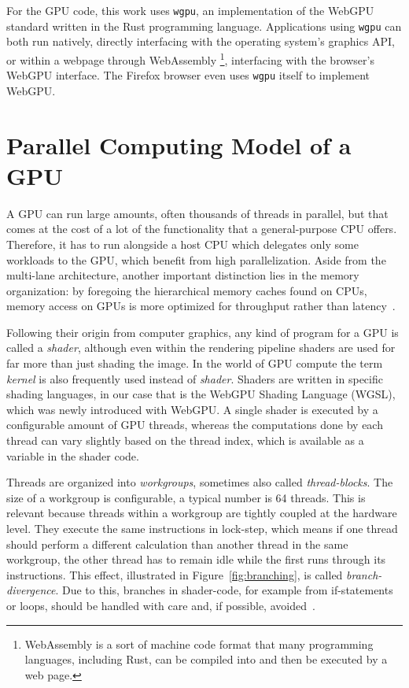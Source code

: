 For the GPU code, this work uses \texttt{wgpu}, an implementation of the WebGPU
standard written in the Rust programming language.
Applications using \texttt{wgpu} can both run natively, directly interfacing with the
operating system's graphics API,
or within a webpage through WebAssembly%
\footnote{WebAssembly is a sort of machine code format that many programming
languages, including Rust, can be compiled into
and then be executed by a web page.},
interfacing with the browser's WebGPU interface.
The Firefox browser even uses \texttt{wgpu} itself to implement WebGPU\@.


\section{Parallel Computing Model of a GPU}\label{sec:gpu_model}

A GPU can run large amounts, often thousands of threads in parallel,
but that comes at the cost of a lot of the functionality
that a general-purpose CPU offers.
Therefore, it has to run alongside a host CPU which delegates only some
workloads to the GPU, which benefit from high parallelization.
Aside from the multi-lane architecture, another important distinction lies in
the memory organization:
by foregoing the hierarchical memory caches found on CPUs,
memory access on GPUs is more optimized for throughput rather than
latency~\cite{Patterson2016}.

Following their origin from computer graphics, any kind of program for a GPU is
called a \emph{shader}, although even within the rendering pipeline
shaders are used for far more than just shading the image.
In the world of GPU compute the term \emph{kernel} is also frequently used
instead of \emph{shader}.
Shaders are written in specific shading languages,
in our case that is the WebGPU Shading Language (WGSL),
which was newly introduced with WebGPU\@.
A single shader is executed by a configurable amount of GPU threads,
whereas the computations done by each thread can vary slightly
based on the thread index,
which is available as a variable in the shader code.

Threads are organized into \emph{workgroups},
sometimes also called \emph{thread-blocks}.
The size of a workgroup is configurable,
a typical number is 64 threads.
This is relevant
because threads within a workgroup are tightly coupled at the hardware level.
They execute the same instructions in lock-step,
which means if one thread should perform a different calculation than another
thread in the same workgroup,
the other thread has to remain idle while the first runs through its
instructions.
This effect, illustrated in Figure~\ref{fig:branching}, is called
\emph{branch-divergence}.
Due to this, branches in shader-code,
for example from if-statements or loops,
should be handled with care and, if possible, avoided~\cite{Hijma2023}.

